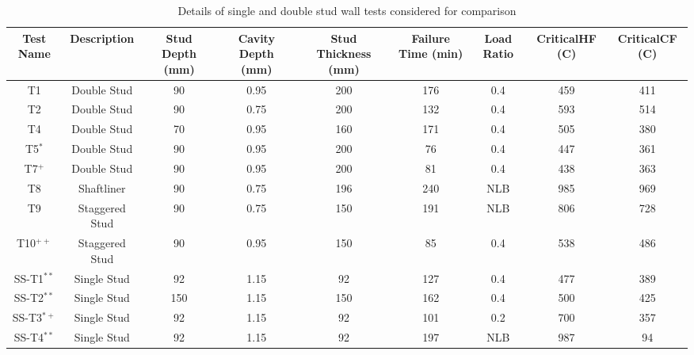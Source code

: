 \begin{sidewaystable}[!htbp]
	\hspace*{3.5cm}
	\begin{threeparttable}
		\centering
		\caption{Details of single and double stud wall tests considered for comparison}
		\begin{tabular}{ccccccccc}
			\toprule
			\multicolumn{1}{p{3em}}{\centering Test Name} & 
			\multicolumn{1}{p{5.5em}}{\centering Description} & 
			\multicolumn{1}{p{3em}}{\centering Stud Depth (mm)} & 
			\multicolumn{1}{p{3em}}{\centering Cavity Depth (mm)} & 
			\multicolumn{1}{p{4.5em}}{\centering Stud Thickness (mm)} & 
			\multicolumn{1}{p{3em}}{\centering Failure Time (min)} & 
			\multicolumn{1}{p{3em}}{\centering Load Ratio} & 
			\multicolumn{1}{p{3.5em}}{\centering Critical\newline{}HF \centering \newline{}(\degree C)} & 
			\multicolumn{1}{p{3.5em}}{\centering Critical\newline{}CF \centering \newline{}(\degree C)} \\
			\midrule
			T1 & Double Stud & 90 & 0.95 & 200 & 176 & 0.4  & 459 & 411 \\
			T2 & Double Stud & 90 & 0.75 & 200 & 132 & 0.4  & 593 & 514 \\
			T4 & Double Stud & 70 & 0.95 & 160 & 171 & 0.4  & 505 & 380 \\
			T5\(^{*}\) & Double Stud & 90 & 0.95 & 200 & 76 & 0.4  & 447 & 361 \\
			T7\(^{+}\) & Double Stud & 90 & 0.95 & 200 & 81 & 0.4  & 438 & 363 \\
			T8 & Shaftliner & 90 & 0.75 & 196 & 240 & NLB  & 985 & 969 \\
			T9 & Staggered Stud & 90 & 0.75 & 150 & 191 & NLB  & 806 & 728 \\
			T10\(^{++}\) & Staggered Stud & 90 & 0.95 & 150 & 85 & 0.4  & 538 & 486 \\
			SS-T1\(^{**}\) & Single Stud & 92 & 1.15 & 92 & 127 & 0.4  & 477 & 389 \\
			SS-T2\(^{**}\) & Single Stud & 150 & 1.15 & 150 & 162 & 0.4  & 500 & 425 \\
			SS-T3\(^{*+}\) & Single Stud & 92 & 1.15 & 92 & 101 & 0.2  & 700 & 357 \\
			SS-T4\(^{**}\) & Single Stud & 92 & 1.15 & 92 & 197 & NLB  & 987 & 94 \\
			\bottomrule
		\end{tabular}
			\label{tab:comparison-single}

\end{threeparttable}
\end{sidewaystable}

